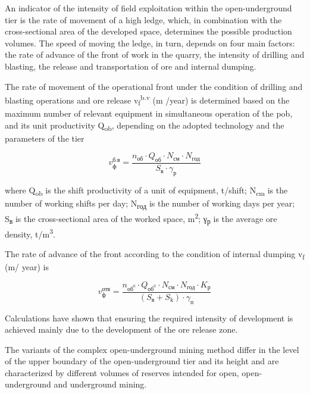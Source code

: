 \begin{multicols}{2}
An indicator of the intensity of field exploitation within the
open-underground tier is the rate of movement of a high ledge, which, in
combination with the cross-sectional area of the developed space,
determines the possible production volumes. The speed of moving the
ledge, in turn, depends on four main factors: the rate of advance of the
front of work in the quarry, the intensity of drilling and blasting, the
release and transportation of ore and internal dumping.

The rate of movement of the operational front under the condition of
drilling and blasting operations and ore release
v\textsubscript{f}\textsuperscript{b.v} (m /year) is determined based on
the maximum number of relevant equipment in simultaneous operation of
the pob, and its unit productivity Q\textsubscript{ob}, depending on the
adopted technology and the parameters of the tier

\begin{equation}
v_{\text{ф}}^{\text{б.в}} = \frac{n_{\text{об}} \cdot Q_{\text{об}} \cdot N_{\text{см}} \cdot N_{\text{год}}}{S_{\text{в}} \cdot \gamma_{\text{р}}}
\end{equation}

where Q\textsubscript{ob} is the shift productivity of a unit of
equipment, t/shift; N\textsubscript{cm} is the number of working shifts
per day; N\textsubscript{год} is the number of working days per year;
S\textsubscript{в} is the cross-sectional area of the worked space,
m\textsuperscript{2}; γ\textsubscript{р} is the average ore density,
t/m\textsuperscript{3}.

The rate of advance of the front according to the condition of internal
dumping v\textsubscript{f} (m/ year) is

\begin{equation}
v_{\text{ф}}^{\text{отв}} = \frac{n_{\text{об}^{0}} \cdot Q_{\text{об}^{0}} \cdot N_{\text{см}} \cdot N_{\text{год}} \cdot K_{\text{р}}}{(S_{\text{в}} + S_{\text{k}}) \cdot \gamma_{\text{п}}}
\end{equation}


Calculations have shown that ensuring the required intensity of
development is achieved mainly due to the development of the ore release
zone.

The variants of the complex open-underground mining method differ in the
level of the upper boundary of the open-underground tier and its height
and are characterized by different volumes of reserves intended for
open, open-underground and underground mining.


\end{multicols}
